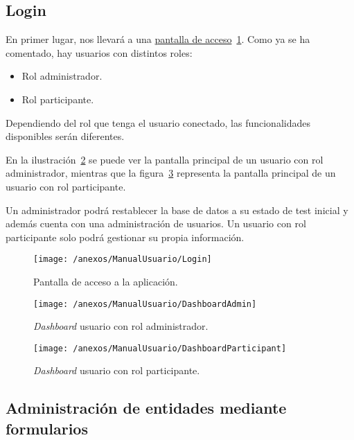 \subsection{Login}

En primer lugar, nos llevará a una \href{https://www.proyectoubu.nesiweb.com/users/login}{pantalla de acceso}~\ref{img:login}. Como ya se ha comentado, hay usuarios con distintos roles:
\begin{itemize}
	\item Rol administrador.
	\item Rol participante.
\end{itemize}

Dependiendo del rol que tenga el usuario conectado, las funcionalidades disponibles serán diferentes.

En la ilustración~\ref{img:DashboardAdmin} se puede ver la pantalla principal de un usuario con rol administrador, mientras que la figura~\ref{img:DashboardPart} representa la pantalla principal de un usuario con rol participante.

Un administrador podrá restablecer la base de datos a su estado de test inicial y además cuenta con una administración de usuarios. Un usuario con rol participante solo podrá gestionar su propia información.

\begin{figure}[h]
	\centering
	\texttt{[image: /anexos/ManualUsuario/Login]}
	\caption{Pantalla de acceso a la aplicación.}
	\label{img:login}
\end{figure}

\begin{figure}[h]
	\centering
	\texttt{[image: /anexos/ManualUsuario/DashboardAdmin]}
	\caption{\textit{Dashboard} usuario con rol administrador.}
	\label{img:DashboardAdmin}
\end{figure}

\begin{figure}[h]
	\centering
	\texttt{[image: /anexos/ManualUsuario/DashboardParticipant]}
	\caption{\textit{Dashboard} usuario con rol participante.}
	\label{img:DashboardPart}
\end{figure}

\newpage

\subsection{Administración de entidades mediante formularios}

